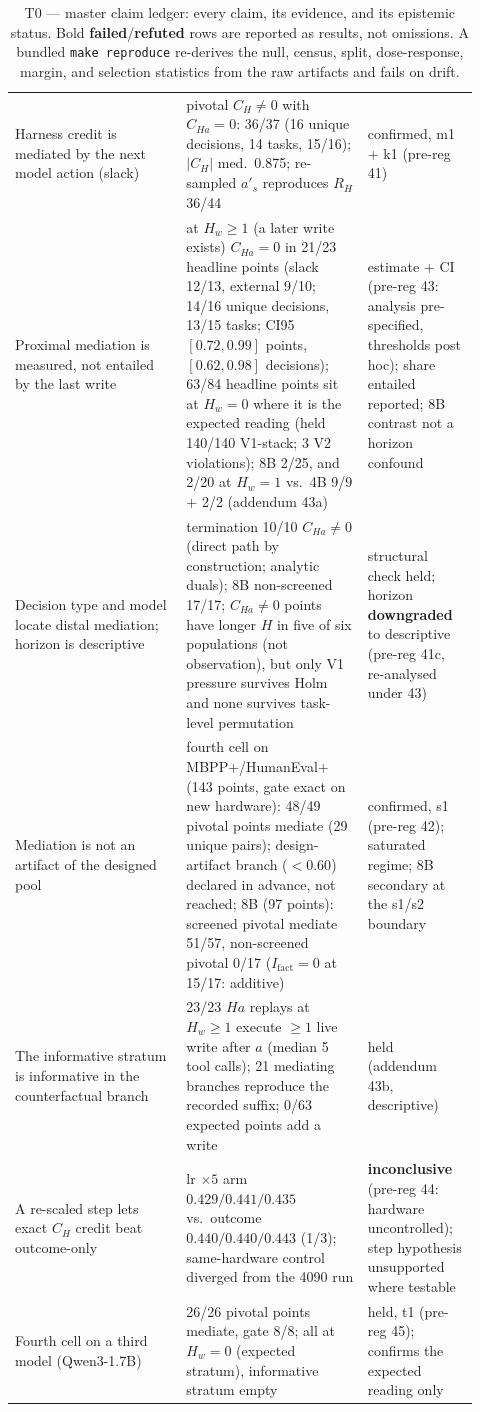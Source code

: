 \documentclass{article}
\theoremstyle{remark}
\begin{document}
\begin{table}[h]
\begin{tabular}{p{0.34\linewidth}p{0.36\linewidth}p{0.22\linewidth}}
Harness credit is mediated by the next model action (slack) & pivotal $C_H\neq0$ with $C_{Ha}=0$: 36/37 (16 unique decisions, 14 tasks, 15/16); $|C_H|$ med.\ 0.875; re-sampled $a'_s$ reproduces $R_H$ 36/44 & confirmed, m1 + k1 (pre-reg 41) \\
Proximal mediation is measured, not entailed by the last write & at $H_w \geq 1$ (a later write exists) $C_{Ha}=0$ in 21/23 headline points (slack 12/13, external 9/10; 14/16 unique decisions, 13/15 tasks; CI95 $[0.72,0.99]$ points, $[0.62,0.98]$ decisions); 63/84 headline points sit at $H_w=0$ where it is the expected reading (held 140/140 V1-stack; 3 V2 violations); 8B 2/25, and 2/20 at $H_w = 1$ vs.\ 4B 9/9 + 2/2 (addendum 43a) & estimate + CI (pre-reg 43: analysis pre-specified, thresholds post hoc); share entailed reported; 8B contrast not a horizon confound \\
Decision type and model locate distal mediation; horizon is descriptive & termination 10/10 $C_{Ha}\neq0$ (direct path by construction; analytic duals); 8B non-screened 17/17; $C_{Ha}\neq0$ points have longer $H$ in five of six populations (not observation), but only V1 pressure survives Holm and none survives task-level permutation & structural check held; horizon \textbf{downgraded} to descriptive (pre-reg 41c, re-analysed under 43) \\
Mediation is not an artifact of the designed pool & fourth cell on MBPP+/HumanEval+ (143 points, gate exact on new hardware): 48/49 pivotal points mediate (29 unique pairs); design-artifact branch ($<0.60$) declared in advance, not reached; 8B (97 points): screened pivotal mediate 51/57, non-screened pivotal 0/17 ($I_{\text{fact}}=0$ at 15/17: additive) & confirmed, s1 (pre-reg 42); saturated regime; 8B secondary at the s1/s2 boundary \\
The informative stratum is informative in the counterfactual branch & 23/23 $Ha$ replays at $H_w \geq 1$ execute $\geq 1$ live write after $a$ (median 5 tool calls); 21 mediating branches reproduce the recorded suffix; 0/63 expected points add a write & held (addendum 43b, descriptive) \\
A re-scaled step lets exact $C_H$ credit beat outcome-only & lr $\times 5$ arm $0.429/0.441/0.435$ vs.\ outcome $0.440/0.440/0.443$ (1/3); same-hardware control diverged from the 4090 run & \textbf{inconclusive} (pre-reg 44: hardware uncontrolled); step hypothesis unsupported where testable \\
Fourth cell on a third model (Qwen3-1.7B) & 26/26 pivotal points mediate, gate 8/8; all at $H_w = 0$ (expected stratum), informative stratum empty & held, t1 (pre-reg 45); confirms the expected reading only \\
\bottomrule
\end{tabular}
\caption{T0 --- master claim ledger: every claim, its evidence, and its
epistemic status. Bold \textbf{failed}/\textbf{refuted} rows are reported as
results, not omissions. A bundled \texttt{make reproduce} re-derives the
null, census, split, dose-response, margin, and selection statistics from
the raw artifacts and fails on drift.}
\label{tab:claims}
\end{table}
\end{document}
